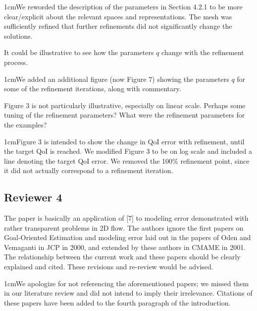 \documentclass[12pt, letterpaper]{article}
\newcommand{\answer}[1]{\begin{adjustwidth}{1cm}{}{\color{blue}#1}\end{adjustwidth}}
\begin{document}
\answer{We reworded the description of the parameters in Section 4.2.1 to be more clear/explicit about the relevant spaces and representations. The mesh was sufficiently refined that further refinements did not significantly change the solutions.}

It could be illustrative to see how the parameters $q$ change with the refinement process.

\answer{We added an additional figure (now Figure 7) showing the parameters $q$ for some of the refinement iterations, along with commentary.}

Figure 3 is not particularly illustrative, especially on linear scale. Perhaps some tuning of the
refinement parameters? What were the refinement parameters for the examples?

\answer{Figure 3 is intended to show the change in QoI error with refinement, until the target QoI is reached. We modified Figure 3 to be on log scale and included a line denoting the target QoI error. We removed the 100\% refinement point, since it did not actually correspond to a refinement iteration.}


\subsection*{Reviewer 4}

The paper is basically an application of [7] to modeling error demonstrated with rather transparent problems in 2D flow. The authors ignore the first papers on Goal-Oriented Estimation and modeling error laid out in the papers of Oden and Vemaganti in JCP in 2000, and extended by these authors in CMAME in 2001. The relationship between the current work and these papers should be clearly explained and cited. These revisions and re-review would be advised.

\answer{We apologize for not referencing the aforementioned papers; we missed them in our literature review and did not intend to imply their irrelevance. Citations of these papers have been added to the fourth paragraph of the introduction.}
\end{document}
